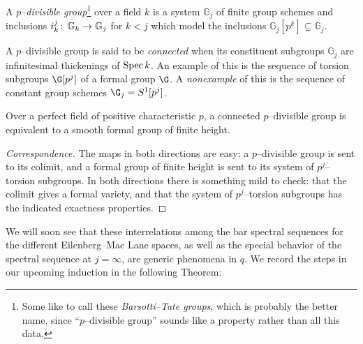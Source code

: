 \begin{definition}
A \textit{$p$--divisible group}\footnote{Some like to call these \textit{Barsotti--Tate groups}, which is probably the better name, since ``$p$--divisible group'' sounds like a property rather than all this data.} over a field $k$ is a system $\mathbb G_j$ of finite group schemes and inclusions $i_k^j\colon\thinspace \mathbb G_k \to \mathbb G_j$ for $k < j$ which model the inclusions $\mathbb G_j[p^k] \subseteq \mathbb G_j$.
\end{definition}

\begin{definition}
A $p$--divisible group is said to be \textit{connected} when its constituent subgroups $\mathbb G_j$ are infinitesimal thickenings of $\operatorname{Spec} k$.  An example of this is the sequence of torsion subgroups $\G[p^j]$ of a formal group $\G$.  A \emph{nonexample} of this is the sequence of constant group schemes $\G_j = S^1[p^j]$.
\end{definition}

\begin{lemma}
Over a perfect field of positive characteristic $p$, a connected $p$--divisible group is equivalent to a smooth formal group of finite height.
\end{lemma}
\begin{proof}[Correspondence]
The maps in both directions are easy: a $p$--divisible group is sent to its colimit, and a formal group of finite height is sent to its system of $p^j$--torsion subgroups.  In both directions there is something mild to check: that the colimit gives a formal variety, and that the system of $p^j$--torsion subgroups has the indicated exactness properties.
\end{proof}

We will soon see that these interrelations among the bar spectral sequences for the different Eilenberg--Mac Lane spaces, as well as the special behavior of the spectral sequence at $j = \infty$, are generic phenomena in $q$.  We record the steps in our upcoming induction in the following Theorem:

